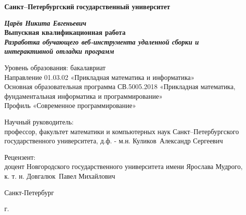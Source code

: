 
\begin{titlepage}
\begin{center}

\textbf{Санкт--Петербургский}
\textbf{государственный университет}

\vspace{35mm}

\textbf{\textit{\large Царёв Никита Евгеньевич}} \\[8mm]
\textbf{\large Выпускная квалификационная работа}\\[3mm]
\textbf{\textit{\large Разработка обучающего веб-инструмента удаленной сборки и интерактивной отладки программ}}

\vspace{20mm}
Уровень образования: бакалавриат\\
Направление 01.03.02 «Прикладная математика и информатика»\\
Основная образовательная программа СВ.5005.2018
«Прикладная математика, фундаментальная информатика и программирование»\\
Профиль «Современное программирование»\\[15mm]


\begin{flushright}
\begin{minipage}[t]{0.7\textwidth}
{Научный руководитель:} \\
профессор, факультет математики и компьютерных наук Санкт--Петербургского
государственного университета, д.ф. - м.н. Куликов~Александр Сергеевич

\vspace{10mm}

{Рецензент:} \\
доцент Новгородского государственного университета имени Ярослава Мудрого,
к. т. н. Довгалюк~Павел Михайлович
\end{minipage}
\end{flushright}

\vfill

{Санкт-Петербург}
\par{\the\year{} г.}
\end{center}
\end{titlepage}
\restoregeometry
\addtocounter{page}{1}
